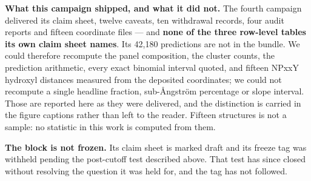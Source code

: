 \textbf{What this campaign shipped, and what it did not.} The fourth campaign
delivered its claim sheet, twelve caveats, ten withdrawal records, four
audit reports and fifteen coordinate files --- and \textbf{none of the three
row-level tables its own claim sheet names}. Its 42{,}180 predictions are not in
the bundle. We could therefore recompute the panel composition, the cluster
counts, the prediction arithmetic, every exact binomial interval quoted, and
fifteen NPxxY hydroxyl distances measured from the deposited coordinates; we
could not recompute a single headline fraction, sub-\AA{}ngstr\"om percentage or
slope interval. Those are reported here as they were delivered, and the
distinction is carried in the figure captions rather than left to the reader.
Fifteen structures is not a sample: no statistic in this work is computed from
them.

\textbf{The block is not frozen.} Its claim sheet is marked draft and its freeze
tag was withheld pending the post-cutoff test described above. That test has
since closed without resolving the question it was held for, and the tag has not
followed.
